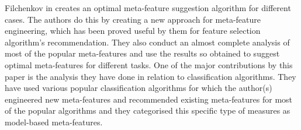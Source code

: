 Filchenkov in \citep{meta-features-2} creates an optimal meta-feature suggestion algorithm for different cases. The authors do this by creating a new approach for meta-feature engineering, which has been proved useful by them for feature selection algorithm's recommendation. They also conduct an almost complete analysis of most of the popular meta-features and use the results so obtained to suggest optimal meta-features for different tasks. One of the major contributions by this paper is the analysis they have done in relation to classification algorithms. They have used various popular classification algorithms for which the author(s) engineered new meta-features and recommended existing meta-features for most of the popular algorithms and they categorised this specific type of measures as model-based meta-features.

